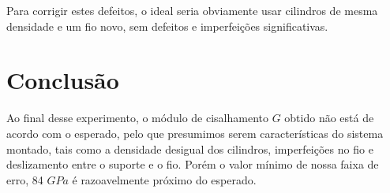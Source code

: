 \documentclass[a4paper]{article}
\begin{document}
Para corrigir estes defeitos, o ideal seria obviamente usar cilindros de mesma densidade e um fio novo, sem defeitos e imperfeições significativas.

\section{Conclusão}

Ao final desse experimento, o módulo de cisalhamento $G$ obtido não está de acordo com o esperado, pelo que presumimos serem características do sistema montado, tais como a densidade desigual dos cilindros, imperfeições no fio e deslizamento entre o suporte e o fio. Porém o valor mínimo de nossa faixa de erro, 84 $GPa$ é razoavelmente próximo do esperado.
\end{document}
